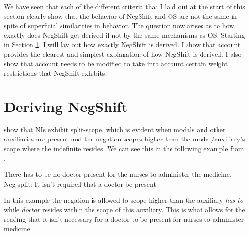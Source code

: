 \documentclass[12pt, letterpaper]{article}
\begin{document}
We have seen that each of the different criteria that I laid out at the start of this section clearly show that the behavior of NegShift and OS are not the same in spite of superficial similarities in behavior. The question now arises as to how exactly does NegShift get derived if not by the same mechanisms as OS. Starting in Section \ref{sec:DERIVING}, I will lay out how exactly NegShift is derived. I show that  account provides the clearest and simplest explanation of how NegShift is derived. I also show that  account needs to be modified to take into account certain weight restrictions that NegShift exhibits.

\section{Deriving NegShift} \label{sec:DERIVING}

\citet{iatridouNegativeDPsAMovement2011} show that NIs exhibit split-scope, which is evident when modals and other auxiliaries are present and the negation scopes higher than the modal/auxiliary's scope where the indefinite resides. We can see this in the following example from \citet{iatridouNegativeDPsAMovement2011}. 

\ea There has to be no doctor present for the nurses to administer the medicine.\\
Neg-split: It isn’t required that a doctor be present
\z 

In this example the negation is allowed to scope higher than the auxiliary \emph{has to} while \emph{doctor} resides within the scope of this auxiliary. This is what allows for the reading that it isn't necessary for a doctor to be present for nurses to administer medicine. 
\end{document}
